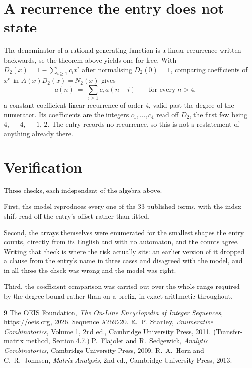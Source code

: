 \documentclass[11pt,a4paper]{article}
\theoremstyle{plain}
\theoremstyle{definition}
\begin{document}
\section{A recurrence the entry does not state}

The denominator of a rational generating function is a linear recurrence written backwards, so
the theorem above yields one for free. With $D_2(x)=1-\sum_{i\ge1}c_ix^i$ after normalising
$D_2(0)=1$, comparing coefficients of $x^n$ in $A(x)D_2(x)=N_2(x)$ gives
\[
a(n)\;=\;\sum_{i\ge1}c_i\,a(n-i)\qquad\text{for every }n>4,
\]
a constant-coefficient linear recurrence of order $4$, valid past the degree of the
numerator. Its coefficients are the integers $c_1,\dots,c_{4}$ read off $D_2$, the first few being $4,\ -4,\ -1,\ 2$. The entry records no recurrence, so this is not a restatement of anything
already there.

\section{Verification}

Three checks, each independent of the algebra above.

First, the model reproduces every one of the $33$ published terms, with the index shift
read off the entry's offset rather than fitted.

Second, the arrays themselves were enumerated for the smallest shapes the entry counts,
directly from its English and with no automaton, and the counts agree. Writing that check is
where the risk actually sits: an earlier version of it dropped a clause from the entry's name
in three cases and disagreed with the model, and in all three the check was wrong and the model
was right.

Third, the coefficient comparison was carried out over the whole range required by the degree
bound rather than on a prefix, in exact arithmetic throughout.

\begin{thebibliography}{9}
 The OEIS Foundation, \emph{The On-Line Encyclopedia of Integer
Sequences}, \url{https://oeis.org}, 2026. Sequence A259220.
 R.~P.~Stanley, \emph{Enumerative Combinatorics}, Volume 1, 2nd ed.,
Cambridge University Press, 2011. (Transfer-matrix method, Section 4.7.)
 P.~Flajolet and R.~Sedgewick, \emph{Analytic Combinatorics}, Cambridge
University Press, 2009.
 R.~A.~Horn and C.~R.~Johnson, \emph{Matrix Analysis}, 2nd ed., Cambridge
University Press, 2013.
\end{thebibliography}
\end{document}
